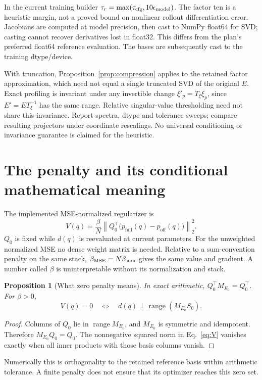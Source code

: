 \documentclass[11pt,a4paper]{article}
\newcommand{\ran}{\operatorname{range}}
\newcommand{\norm}[1]{\left\lVert#1\right\rVert}
\newcommand{\full}{\mathrm{full}}
\newcommand{\off}{\mathrm{off}}
\newtheorem{proposition}{Proposition}[section]
\theoremstyle{remark}
\begin{document}
In the current training builder $\tau_r=\max(\tau_{\rm cfg},10\epsilon_{\rm model})$. The factor ten is a heuristic margin, not a proved bound on nonlinear rollout differentiation error. Jacobians are computed at model precision, then cast to NumPy float64 for SVD; casting cannot recover derivatives lost in float32. This differs from the plan's preferred float64 reference evaluation. The bases are subsequently cast to the training dtype/device.

With truncation, Proposition~\ref{prop:compression} applies to the retained factor approximation, which need not equal a single truncated SVD of the original $E$. Exact profiling is invariant under any invertible change $\xi'_p=T_\xi\xi_p$, since $E'=ET_\xi^{-1}$ has the same range. Relative singular-value thresholding need not share this invariance. Report spectra, dtype and tolerance sweeps; compare resulting projectors under coordinate rescalings. No universal conditioning or invariance guarantee is claimed for the heuristic.

\section{The penalty and its conditional mathematical meaning}\label{sec:penalty}
The implemented MSE-normalized regularizer is
\begin{equation}\label{eq:V}
 \boxed{V(q)=\frac{\beta}{N}\norm{Q_0^\top\big(p_\full(q)-p_\off(q)\big)}_2^2.}
\end{equation}
$Q_0$ is fixed while $d(q)$ is reevaluated at current parameters. For the unweighted normalized MSE no dense weight matrix is needed. Relative to a sum-convention penalty on the same stack, $\beta_{\rm MSE}=N\beta_{\rm sum}$ gives the same value and gradient. A number called $\beta$ is uninterpretable without its normalization and stack.

\begin{proposition}[What zero penalty means]\label{prop:zero}
In exact arithmetic, $Q_0^\top M_{E_0}=Q_0^\top$. For $\beta>0$,
\begin{equation}\label{eq:zero}
 V(q)=0\quad\Longleftrightarrow\quad
 d(q)\perp\ran(M_{E_0}S_0).
\end{equation}
\end{proposition}
\begin{proof}
Columns of $Q_0$ lie in $\ran M_{E_0}$, and $M_{E_0}$ is symmetric and idempotent. Therefore $M_{E_0}Q_0=Q_0$. The nonnegative squared norm in Eq.~\eqref{eq:V} vanishes exactly when all inner products with those basis columns vanish.
\end{proof}
Numerically this is orthogonality to the retained reference basis within arithmetic tolerance. A finite penalty does not ensure that its optimizer reaches this zero set.
\end{document}

